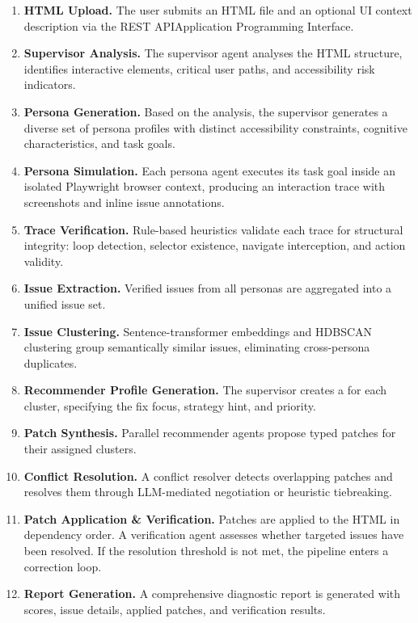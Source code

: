 \begin{enumerate}
  \item \textbf{HTML Upload.} The user submits an HTML file and an optional UI context description via the REST \acrfull{API}{Application Programming Interface}.

  \item \textbf{Supervisor Analysis.} The supervisor agent analyses the HTML structure, identifies interactive elements, critical user paths, and accessibility risk indicators.

  \item \textbf{Persona Generation.} Based on the analysis, the supervisor generates a diverse set of persona profiles with distinct accessibility constraints, cognitive characteristics, and task goals.

  \item \textbf{Persona Simulation.} Each persona agent executes its task goal inside an isolated Playwright browser context, producing an interaction trace with screenshots and inline issue annotations.

  \item \textbf{Trace Verification.} Rule-based heuristics validate each trace for structural integrity: loop detection, selector existence, navigate interception, and action validity.

  \item \textbf{Issue Extraction.} Verified issues from all personas are aggregated into a unified issue set.

  \item \textbf{Issue Clustering.} Sentence-transformer embeddings and HDBSCAN clustering group semantically similar issues, eliminating cross-persona duplicates.

  \item \textbf{Recommender Profile Generation.} The supervisor creates a  for each cluster, specifying the fix focus, strategy hint, and priority.

  \item \textbf{Patch Synthesis.} Parallel recommender agents propose typed patches for their assigned clusters.

  \item \textbf{Conflict Resolution.} A conflict resolver detects overlapping patches and resolves them through LLM-mediated negotiation or heuristic tiebreaking.

  \item \textbf{Patch Application \& Verification.} Patches are applied to the HTML in dependency order. A verification agent assesses whether targeted issues have been resolved. If the resolution threshold is not met, the pipeline enters a correction loop.

  \item \textbf{Report Generation.} A comprehensive diagnostic report is generated with scores, issue details, applied patches, and verification results.
\end{enumerate}

